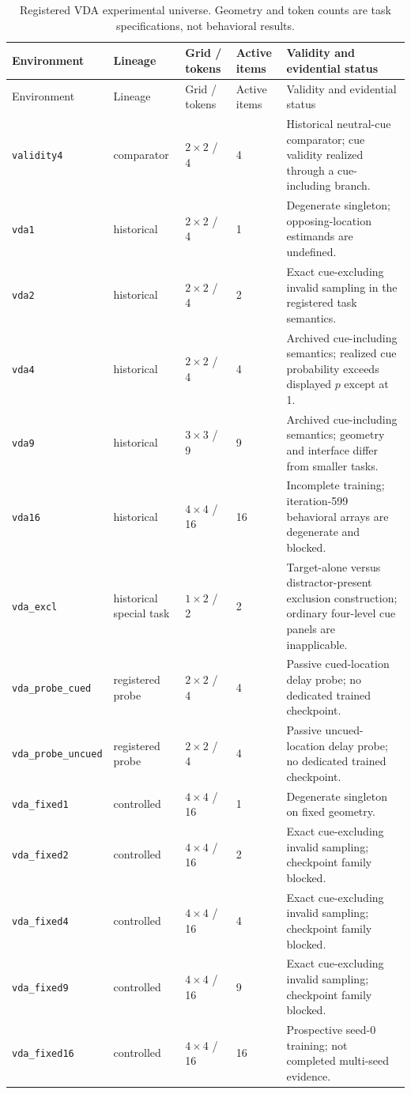 \documentclass[11pt,a4paper]{article}
\newcommand{\env}[1]{\texttt{#1}}
\begin{document}
\begingroup\small
\begin{longtable}{@{}>{\RaggedRight\arraybackslash}p{3.2cm}p{2.2cm}p{2.3cm}p{2.0cm}p{5.4cm}@{}}
\caption{Registered VDA experimental universe. Geometry and token counts are task specifications, not behavioral results.}\label{tab:environments}\\
\toprule
Environment & Lineage & Grid / tokens & Active items & Validity and evidential status\\
\midrule\endfirsthead
\toprule Environment & Lineage & Grid / tokens & Active items & Validity and evidential status\\\midrule\endhead
\env{validity4} & comparator & $2\times2$ / 4 & 4 & Historical neutral-cue comparator; cue validity realized through a cue-including branch.\\
\env{vda1} & historical & $2\times2$ / 4 & 1 & Degenerate singleton; opposing-location estimands are undefined.\\
\env{vda2} & historical & $2\times2$ / 4 & 2 & Exact cue-excluding invalid sampling in the registered task semantics.\\
\env{vda4} & historical & $2\times2$ / 4 & 4 & Archived cue-including semantics; realized cue probability exceeds displayed $p$ except at 1.\\
\env{vda9} & historical & $3\times3$ / 9 & 9 & Archived cue-including semantics; geometry and interface differ from smaller tasks.\\
\env{vda16} & historical & $4\times4$ / 16 & 16 & Incomplete training; iteration-599 behavioral arrays are degenerate and blocked.\\
\env{vda\_excl} & historical special task & $1\times2$ / 2 & 2 & Target-alone versus distractor-present exclusion construction; ordinary four-level cue panels are inapplicable.\\
\env{vda\_probe\_cued} & registered probe & $2\times2$ / 4 & 4 & Passive cued-location delay probe; no dedicated trained checkpoint.\\
\env{vda\_probe\_uncued} & registered probe & $2\times2$ / 4 & 4 & Passive uncued-location delay probe; no dedicated trained checkpoint.\\
\env{vda\_fixed1} & controlled & $4\times4$ / 16 & 1 & Degenerate singleton on fixed geometry.\\
\env{vda\_fixed2} & controlled & $4\times4$ / 16 & 2 & Exact cue-excluding invalid sampling; checkpoint family blocked.\\
\env{vda\_fixed4} & controlled & $4\times4$ / 16 & 4 & Exact cue-excluding invalid sampling; checkpoint family blocked.\\
\env{vda\_fixed9} & controlled & $4\times4$ / 16 & 9 & Exact cue-excluding invalid sampling; checkpoint family blocked.\\
\env{vda\_fixed16} & controlled & $4\times4$ / 16 & 16 & Prospective seed-0 training; not completed multi-seed evidence.\\
\bottomrule
\end{longtable}
\endgroup
\end{document}
